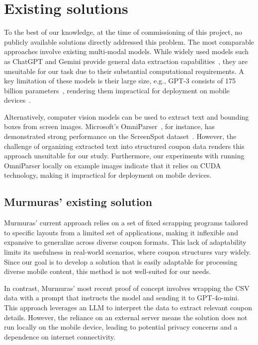 \documentclass[licencjacka,en]{pracamgr}
\begin{document}
\chapter{Existing solutions} \label{chap:existing_solutions}
To the best of our knowledge, at the time of commissioning of this project, no publicly available solutions directly addressed this problem. The most comparable approaches involve existing multi-modal models. While widely used models such as ChatGPT and Gemini provide general data extraction capabilities~\cite{brinkmann2023}, they are unsuitable for our task due to their substantial computational requirements. A key limitation of these models is their large size, e.g., GPT-3 consists of 175 billion parameters~\cite{chatgpt_params}, rendering them impractical for deployment on mobile devices~\cite{LinguaLinked}.

Alternatively, computer vision models can be used to extract text and bounding boxes from screen images. Microsoft’s OmniParser~\cite{omniparser_intro}, for instance, has demonstrated strong performance on the ScreenSpot dataset~\cite{omniparser_intro, cheng2024}. However, the challenge of organizing extracted text into structured coupon data renders this approach unsuitable for our study. Furthermore, our experiments with running OmniParser locally on example images indicate that it relies on CUDA technology, making it impractical for deployment on mobile devices.

\section{Murmuras' existing solution}
Murmuras' current approach relies on a set of fixed scrapping programs tailored to specific layouts from a limited set of applications, making it inflexible and expansive to generalize across diverse coupon formats. This lack of adaptability limits its usefulness in real-world scenarios, where coupon structures vary widely. Since our goal is to develop a solution that is easily adaptable for processing diverse mobile content, this method is not well-suited for our needs.

In contrast, Murmuras' most recent proof of concept involves wrapping the CSV data with a prompt that instructs the model and sending it to GPT-4o-mini. This approach leverages an LLM to interpret the data to extract relevant coupon details. However, the reliance on an external server means the solution does not run locally on the mobile device, leading to potential privacy concerns and a dependence on internet connectivity.
\end{document}
